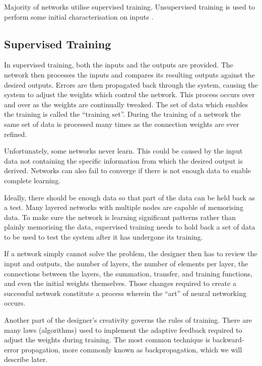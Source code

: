 Majority of networks utilise supervised training. Unsupervised training is used to perform some initial characterisation on inputs \cite{mostcommon}.

\vspace{10pt}

\subsection*{Supervised Training}

In supervised training, both the inputs and the outputs are provided. The network then processes the inputs and compares its resulting outputs against the desired outputs. Errors are then propagated back through the system, causing the system to adjust the weights which control the network. This process occurs over and over as the weights are continually tweaked. The set of data which enables the training is called the ``training set''. During the training of a network the same set of data is processed many times as the connection weights are ever refined.

Unfortunately, some networks never learn. This could be caused by the input data not containing the specific information from which the desired output is derived. Networks can also fail to converge if there is not enough data to enable complete learning. 

Ideally, there should be enough data so that part of the data can be held back as a test. Many layered networks with multiple nodes are capable of memorising data. To make sure the network is learning significant patterns rather than plainly memorising the data, supervised training needs to hold back a set of data to be used to test the system after it has undergone its training.

If a network simply cannot solve the problem, the designer then has to review the input and outputs, the number of layers, the number of elements per layer, the connections between the layers, the summation, transfer, and training functions, and even the initial weights themselves. Those changes required to create a successful network constitute a process wherein the ``art'' of neural networking occurs.

Another part of the designer's creativity governs the rules of training. There are many laws (algorithms) used to implement the adaptive feedback required to adjust the weights during training. The most common technique is backward-error propagation, more commonly known as backpropagation, which we will describe later.

